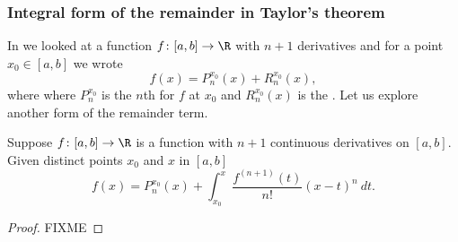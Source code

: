 
\subsubsection{Integral form of the remainder in Taylor's theorem}

In  we looked at a function $f \colon [a,b] \to \R$
with $n+1$ derivatives and for a point $x_0 \in [a,b]$ we wrote
\begin{equation*}
f(x)=P_{n}^{x_0}(x)+R_{n}^{x_0}(x) ,
\end{equation*}
where where $P_n^{x_0}$ is the $n$th  for 
$f$ at $x_0$ and 
$R_{n}^{x_0}(x)$ is the .
Let us explore another form of the remainder term.

\begin{thm}
Suppose $f \colon [a,b] \to \R$ is a function with $n+1$ continuous
derivatives on $[a,b]$.
Given distinct points $x_0$ and $x$ in $[a,b]$
\begin{equation*}
f(x)=P_{n}^{x_0}(x)+
\int_{x_0}^x
\frac{f^{(n+1)}(t)}{n!}{(x-t)}^{n} ~dt .
\end{equation*}
\end{thm}

\begin{proof}
FIXME
\end{proof}
